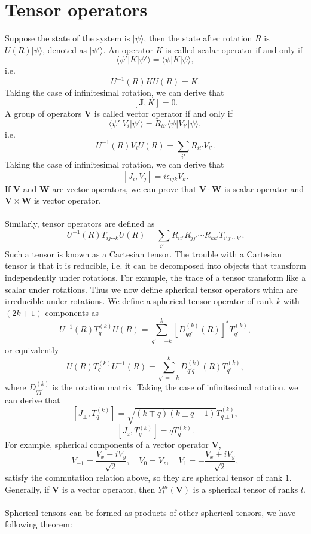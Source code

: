 \section{Tensor operators}
Suppose the state of the system is $|\psi\rangle$, then the state after rotation $R$ is $U(R)|\psi\rangle$, denoted as $|\psi'\rangle$. An operator $K$ is called scalar operator if and only if
\[\langle \psi' | K | \psi' \rangle = \langle \psi | K | \psi\rangle,\]
i.e.
\[U^{-1}(R)KU(R) = K.\]
Taking the case of infinitesimal rotation, we can derive that
\[[\bm{J},K] = 0.\]
A group of operators $\bm{V}$ is called vector operator if and only if
\[\langle \psi' | V_i | \psi' \rangle = R_{ii'} \langle \psi | V_{i'} | \psi\rangle,\]
i.e.
\[U^{-1}(R)V_{i}U(R) = \sum_{i'} R_{ii'} V_{i'}.\]
Taking the case of infinitesimal rotation, we can derive that
\[[J_i, V_j] = i\epsilon_{ijk}V_k.\]
If $\bm{V}$ and $\bm{W}$ are vector operators, we can prove that $\bm{V} \cdot \bm{W}$ is scalar operator and $\bm{V} \times \bm{W}$ is vector operator.
\\ \\
Similarly, tensor operators are defined as
\[U^{-1}(R) T_{ij\cdots k} U(R) = \sum_{i'\cdots} R_{ii'} R_{jj'} \cdots R_{kk'} T_{i'j'\cdots k'}.\]
Such a tensor is known as a Cartesian tensor.
The trouble with a Cartesian tensor is that it is reducible, i.e. it can be decomposed into objects that transform independently under rotations. For example, the trace of a tensor transform like a scalar under rotations. 
Thus we now define spherical tensor operators which are irreducible under rotations.  We define a spherical tensor operator of rank $k$ with $(2k+1)$ components as
\[U^{-1}(R) T^{(k)}_q U(R) = \sum_{q'=-k}^{k} [D^{(k)}_{qq'}(R)]^* T^{(k)}_{q'},\]
or equivalently
\[U(R) T^{(k)}_q U^{-1}(R) = \sum_{q'=-k}^{k} D^{(k)}_{q'q}(R) T^{(k)}_{q'},\]
where $D^{(k)}_{qq'}$ is the rotation matrix.
Taking the case of infinitesimal rotation, we can derive that
\[[J_{\pm},T^{(k)}_{q}] = \sqrt{(k \mp q)(k \pm q +1)} T^{(k)}_{q \pm 1},\]
\[[J_z, T^{(k)}_{q}] = q T^{(k)}_{q}.\]
For example, spherical components of a vector operator $\bm{V}$, 
\[V_{-1} = \frac{V_x - i V_y}{\sqrt{2}} , \quad V_0 = V_z , \quad V_{1} = -\frac{V_x + i V_y}{\sqrt{2}} ,\]
satisfy the commutation relation above, so they are spherical tensor of rank $1$. Generally, if $\bm{V}$ is a vector operator, then $Y_l^m(\bm{V})$ is a spherical tensor of ranks $l$.
\\ \\
Spherical tensors can be formed as products of other spherical  tensors, we have following theorem:
\\

